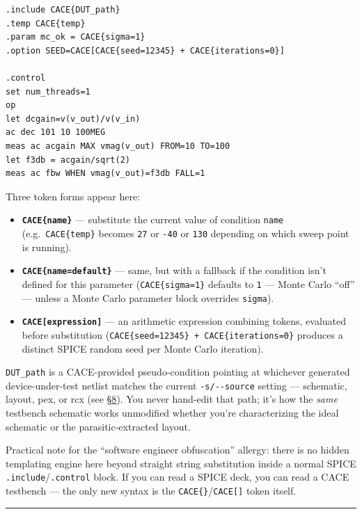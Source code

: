 \documentclass[
]{article}
\providecommand{\tightlist}{%
  \setlength{\itemsep}{0pt}\setlength{\parskip}{0pt}}
\begin{document}
\begin{verbatim}
.include CACE{DUT_path}
.temp CACE{temp}
.param mc_ok = CACE{sigma=1}
.option SEED=CACE[CACE{seed=12345} + CACE{iterations=0}]

.control
set num_threads=1
op
let dcgain=v(v_out)/v(v_in)
ac dec 101 10 100MEG
meas ac acgain MAX vmag(v_out) FROM=10 TO=100
let f3db = acgain/sqrt(2)
meas ac fbw WHEN vmag(v_out)=f3db FALL=1
\end{verbatim}

Three token forms appear here:

\begin{itemize}
\tightlist
\item
  \textbf{\texttt{CACE\{name\}}} --- substitute the current value of
  condition \texttt{name} (e.g.~\texttt{CACE\{temp\}} becomes
  \texttt{27} or \texttt{-40} or \texttt{130} depending on which sweep
  point is running).
\item
  \textbf{\texttt{CACE\{name=default\}}} --- same, but with a fallback
  if the condition isn't defined for this parameter
  (\texttt{CACE\{sigma=1\}} defaults to \texttt{1} --- Monte Carlo
  ``off'' --- unless a Monte Carlo parameter block overrides
  \texttt{sigma}).
\item
  \textbf{\texttt{CACE{[}expression{]}}} --- an arithmetic expression
  combining tokens, evaluated before substitution
  (\texttt{CACE\{seed=12345\}\ +\ CACE\{iterations=0\}} produces a
  distinct SPICE random seed per Monte Carlo iteration).
\end{itemize}

\texttt{DUT\_path} is a CACE-provided pseudo-condition pointing at
whichever generated device-under-test netlist matches the current
\texttt{-s/-\/-source} setting --- schematic, layout, pex, or rcx (see
\protect\hyperlink{8-post-layout-characterization}{§8}). You never
hand-edit that path; it's how the \emph{same} testbench schematic works
unmodified whether you're characterizing the ideal schematic or the
parasitic-extracted layout.

Practical note for the ``software engineer obfuscation'' allergy: there
is no hidden templating engine here beyond straight string substitution
inside a normal SPICE \texttt{.include}/\texttt{.control} block. If you
can read a SPICE deck, you can read a CACE testbench --- the only new
syntax is the \texttt{CACE\{\}}/\texttt{CACE{[}{]}} token itself.

\begin{center}\rule{0.5\linewidth}{0.5pt}\end{center}
\end{document}
